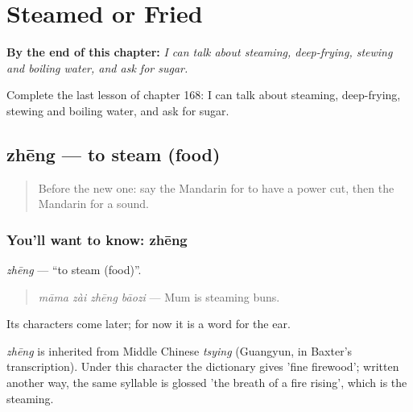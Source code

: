 
\chapter{Steamed or Fried}
\label{ch:zh-steamed-or-fried}

\begin{chapteropening}
\textbf{By the end of this chapter:} \emph{I can talk about steaming, deep-frying, stewing and boiling water, and ask for sugar.}

Complete the last lesson of chapter 168: I can talk about steaming, deep-frying, stewing and boiling water, and ask for sugar.
\end{chapteropening}

\section[zhēng]{zhēng — to steam (food)}

\label{lesson:ZH-C168-zheng}



\begin{quote}
Before the new one: say the Mandarin for to have a power cut, then the Mandarin for a sound.
\end{quote}

\subsection*{You'll want to know: zhēng}
\emph{zhēng} — \textquotedblleft{}to steam (food)\textquotedblright{}.

\begin{quote}
\emph{māma zài zhēng bāozi} — Mum is steaming buns.
\end{quote}

Its characters come later; for now it is a word for the ear.

\begin{cousinweb}
\emph{zhēng} is inherited from Middle Chinese \emph{tsying} (Guangyun, in Baxter's transcription). Under this character the dictionary gives 'fine firewood'; written another way, the same syllable is glossed 'the breath of a fire rising', which is the steaming.
\end{cousinweb}

